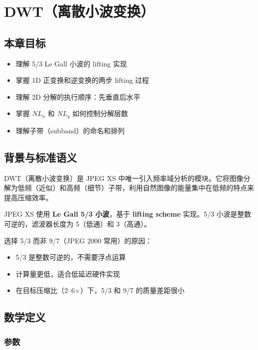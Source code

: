 
\chapter{DWT（离散小波变换）}\label{ch:dwt}

\section{本章目标}

\begin{itemize}
  \item 理解 5/3 Le Gall 小波的 lifting 实现
  \item 掌握 1D 正变换和逆变换的两步 lifting 过程
  \item 理解 2D 分解的执行顺序：先垂直后水平
  \item 掌握 $NL_x$ 和 $NL_y$ 如何控制分解层数
  \item 理解子带（subband）的命名和排列
\end{itemize}

\section{背景与标准语义}

DWT（离散小波变换）是 JPEG XS 中唯一引入频率域分析的模块。它将图像分解为低频（近似）和高频（细节）子带，利用自然图像的能量集中在低频的特点来提高压缩效率。

JPEG XS 使用 \textbf{Le Gall 5/3 小波}，基于 \textbf{lifting scheme} 实现。5/3 小波是整数可逆的，滤波器长度为 5（低通）和 3（高通）。

选择 5/3 而非 9/7（JPEG 2000 常用）的原因：
\begin{itemize}
  \item 5/3 是整数可逆的，不需要浮点运算
  \item 计算量更低，适合低延迟硬件实现
  \item 在目标压缩比（2--6$\times$）下，5/3 和 9/7 的质量差距很小
\end{itemize}

\section{数学定义}

\subsection{参数}

